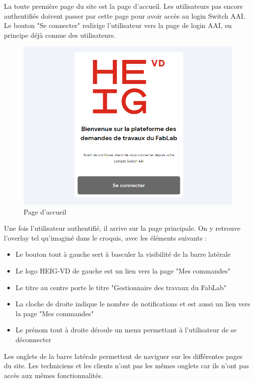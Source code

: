\documentclass[
    iai, %
    eai, %
]{heig-tb}
\begin{document}
La toute première page du site est la page d'accueil. Les utilisateurs pas encore authentifiés doivent passer par cette page pour avoir accès au login Switch AAI.
Le bouton "Se connecter" redirige l'utilisateur vers la page de login AAI, en principe déjà connue des utilisateurs.

\begin{figure}[h]
  \includegraphics[width=14cm]{ui_welcome.PNG}
  \caption{Page d'accueil}
  \label{img:welcome}
\end{figure}

Une fois l'utilisateur authentifié, il arrive sur la page principale.
On y retrouve l'overlay tel qu'imaginé dans le croquis, avec les éléments suivants :
\begin{itemize}
  \item Le bouton tout à gauche sert à basculer la visibilité de la barre latérale
  \item Le logo HEIG-VD de gauche est un lien vers la page "Mes commandes"
  \item Le titre au centre porte le titre "Gestionnaire des travaux du FabLab"
  \item La cloche de droite indique le nombre de notifications et est aussi un lien vers la page "Mes commandes"
  \item Le prénom tout à droite déroule un menu permettant à l'utilisateur de se déconnecter
\end{itemize}
\bigskip

Les onglets de la barre latérale permettent de naviguer sur les différentes pages du site. Les techniciens et les clients n'ont pas les mêmes onglets car ils n'ont pas accès aux mêmes fonctionnalités.
\end{document}
